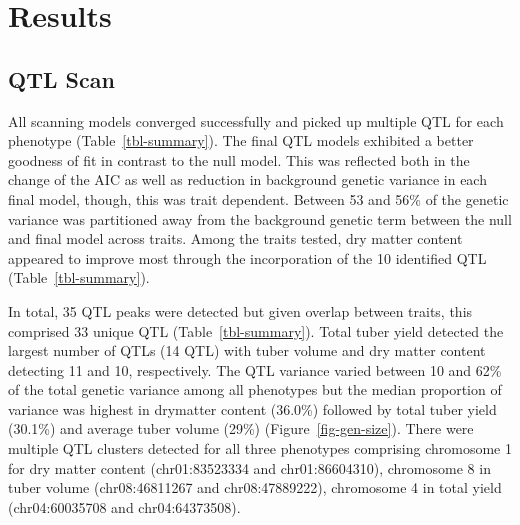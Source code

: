 \section{Results}

\subsection{QTL Scan}\label{qtl-scan}

All scanning models converged successfully and picked up multiple QTL
for each phenotype (Table~\ref{tbl-summary}). The final QTL models
exhibited a better goodness of fit in contrast to the null model. This
was reflected both in the change of the AIC as well as reduction in
background genetic variance in each final model, though, this was trait
dependent. Between 53 and 56\% of the genetic variance was partitioned
away from the background genetic term between the null and final model
across traits. Among the traits tested, dry matter content appeared to
improve most through the incorporation of the 10 identified QTL
(Table~\ref{tbl-summary}).

In total, 35 QTL peaks were detected but given overlap between traits,
this comprised 33 unique QTL (Table~\ref{tbl-summary}). Total tuber
yield detected the largest number of QTLs (14 QTL) with tuber volume and
dry matter content detecting 11 and 10, respectively. The QTL variance
varied between 10 and 62\% of the total genetic variance among all
phenotypes but the median proportion of variance was highest in
drymatter content (36.0\%) followed by total tuber yield (30.1\%) and
average tuber volume (29\%) (Figure~\ref{fig-gen-size}). There were multiple QTL clusters detected for all three phenotypes comprising chromosome 1 for
dry matter content (chr01:83523334 and chr01:86604310), chromosome 8 in
tuber volume (chr08:46811267 and chr08:47889222), chromosome 4 in total
yield (chr04:60035708 and chr04:64373508).

